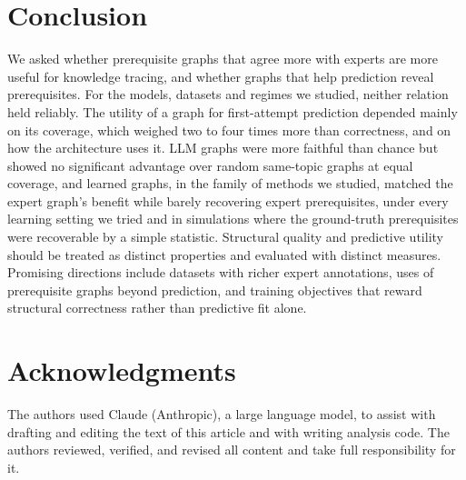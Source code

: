 \documentclass[lettersize,journal]{IEEEtran}
\begin{document}
\section{Conclusion}
We asked whether prerequisite graphs that agree more with experts are more useful for knowledge tracing, and whether graphs that help prediction reveal prerequisites. For the models, datasets and regimes we studied, neither relation held reliably. The utility of a graph for first-attempt prediction depended mainly on its coverage, which weighed two to four times more than correctness, and on how the architecture uses it. LLM graphs were more faithful than chance but showed no significant advantage over random same-topic graphs at equal coverage, and learned graphs, in the family of methods we studied, matched the expert graph's benefit while barely recovering expert prerequisites, under every learning setting we tried and in simulations where the ground-truth prerequisites were recoverable by a simple statistic. Structural quality and predictive utility should be treated as distinct properties and evaluated with distinct measures. Promising directions include datasets with richer expert annotations, uses of prerequisite graphs beyond prediction, and training objectives that reward structural correctness rather than predictive fit alone.

\section*{Acknowledgments}
The authors used Claude (Anthropic), a large language model, to assist with drafting and editing the text of this article and with writing analysis code. The authors reviewed, verified, and revised all content and take full responsibility for it.



\end{document}
